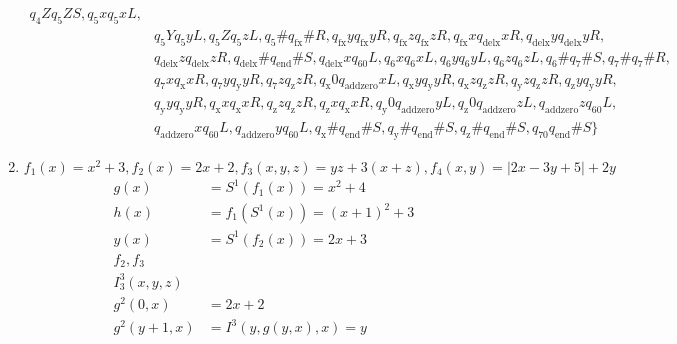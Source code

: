 \documentclass[a4paper,12pt, centered]{article}
\begin{document}
\begin{enumerate}
\begin{align*}
q_4Zq_5ZS, q_5xq_5xL,\\& q_5Yq_5yL, q_5Zq_5zL, q_5\#q_{\textrm{fx}}\#R, q_{\textrm{fx}}yq_{\textrm{fx}}yR, q_{\textrm{fx}}zq_{\textrm{fx}}zR, q_{\textrm{fx}}xq_{\textrm{delx}}xR, q_{\textrm{delx}}yq_{\textrm{delx}}yR, \\&q_{\textrm{delx}}zq_{\textrm{delx}}zR, q_{\textrm{delx}}\#q_{\textrm{end}}\#S, q_{\textrm{delx}}xq_60L, q_6xq_6xL, q_6yq_6yL, q_6zq_6zL, q_6\#q_7\#S, q_7\#q_7\#R,\\& q_7xq_{\textrm{x}}xR, q_7yq_{\textrm{y}}yR, q_7zq_{\textrm{z}}zR, q_{\textrm{x}}0q_{\textrm{addzero}}xL, q_{\textrm{x}}yq_{\textrm{y}}yR, q_{\textrm{x}}zq_{\textrm{z}}zR, q_{\textrm{y}}zq_{\textrm{z}}zR, q_{\textrm{z}}yq_{\textrm{y}}yR, \\&q_{\textrm{y}}yq_{\textrm{y}}yR, q_{\textrm{x}}xq_{\textrm{x}}xR, q_{\textrm{z}}zq_{\textrm{z}}zR, q_{\textrm{z}}xq_{\textrm{x}}xR, q_{\textrm{y}}0q_{\textrm{addzero}}yL, q_{\textrm{z}}0q_{\textrm{addzero}}zL, q_{\textrm{addzero}}zq_60L,\\& q_{\textrm{addzero}}xq_60L, q_{\textrm{addzero}}yq_60L, q_{\textrm{x}}\#q_{\textrm{end}}\#S, q_{\textrm{y}}\#q_{\textrm{end}}\#S, q_{\textrm{z}}\#q_{\textrm{end}}\#S, q_70q_{\textrm{end}}\#S\}
			\end{align*}
		\item $f_1(x)=x^2+3,f_2(x)=2x+2,f_3(x,y,z)=yz+3(x+z),f_4(x,y)=|2x-3y+5|+2y$
			\begin{align*}
				g(x)&=S^1(f_1(x))=x^2+4\\
				h(x)&=f_1(S^1(x))=(x+1)^2+3\\
				y(x)&=S^1(f_2(x))=2x+3\\f_2,f_3\\I_3^3(x,y,z)\\g^2(0,x)&=2x+2\\g^2(y+1,x)&=I^3(y,g(y,x),x)=y
			\end{align*}
\end{enumerate}
\end{document}
